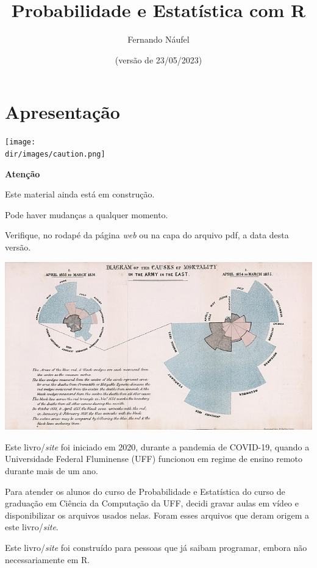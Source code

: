 \documentclass[
  11pt]{report}
\title{Probabilidade e Estatística com R}
\author{Fernando Náufel}
\date{(versão de 23/05/2023)}
\newcommand{\dir}{/ssd/R/x86_64-pc-linux-gnu-library/4.3/fnaufelRmd/rmarkdown/resources}
\newenvironment{rmdcaution}
{
  \begin{mycaution}
    \texttt{[image: \\dir/images/caution.png]}
    \tcblower
  }
  {
  \end{mycaution}
}
\begin{document}
\maketitle

{
\setcounter{tocdepth}{1}
\tableofcontents
}
\hypertarget{apresentacao}{%
\chapter*{Apresentação}\label{apresentacao}}

\begin{rmdcaution}
\textbf{Atenção}

Este material ainda está em construção.

Pode haver mudanças a qualquer momento.

Verifique, no rodapé da página \emph{web} ou na capa do arquivo pdf, a data desta versão.

\end{rmdcaution}

\newpage

\includegraphics{images/640px-Nightingale-mortality.jpg}

\vspace{2cm}

Este livro/\emph{site} foi iniciado em 2020, durante a pandemia de COVID-19, quando a Universidade Federal Fluminense (UFF) funcionou em regime de ensino remoto durante mais de um ano.

Para atender os alunos do curso de Probabilidade e Estatística do curso de graduação em Ciência da Computação da UFF, decidi gravar aulas em vídeo e disponibilizar os arquivos usados nelas. Foram esses arquivos que deram origem a este livro/\emph{site}.

Este livro/\emph{site} foi construído para pessoas que já saibam programar, embora não necessariamente em R.
\end{document}
